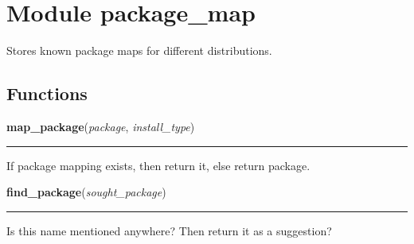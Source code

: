 %
%
%


\section{Module package\_map}

    \label{package_map}
Stores known package maps for different distributions.



  \subsection{Functions}

    \label{package_map:map_package}

    \vspace{0.5ex}

\hspace{.8\funcindent}\begin{boxedminipage}{\funcwidth}

    \raggedright \textbf{map\_package}(\textit{package}, \textit{install\_type})

    \vspace{-1.5ex}

    \rule{\textwidth}{0.5\fboxrule}
\setlength{\parskip}{2ex}
    If package mapping exists, then return it, else return package.

\setlength{\parskip}{1ex}
    \end{boxedminipage}

    \label{package_map:find_package}

    \vspace{0.5ex}

\hspace{.8\funcindent}\begin{boxedminipage}{\funcwidth}

    \raggedright \textbf{find\_package}(\textit{sought\_package})

    \vspace{-1.5ex}

    \rule{\textwidth}{0.5\fboxrule}
\setlength{\parskip}{2ex}
    Is this name mentioned anywhere? Then return it as a suggestion?

\setlength{\parskip}{1ex}
    \end{boxedminipage}


